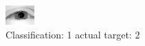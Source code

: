 \begin{figure}[h!]
\begin{center}
\includegraphics[width=0.60\columnwidth]{figures/ID2312_class_1_target_2.png}
\end{center}
\caption{ Classification: 1 actual target: 2}
\label{fig:ID2312_class_1_target_2}
\end{figure}
